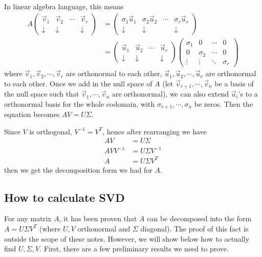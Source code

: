 \documentclass{article}
\begin{document}
In linear algebra language, this means 
\begin{align*}
A \begin{pmatrix} \vec{v}_1 & \vec{v}_2 & \cdots & \vec{v}_r  \\ \downarrow & \downarrow & &\downarrow \end{pmatrix} &= \begin{pmatrix} \sigma_1 \vec{u}_1 & \sigma_2 \vec{u}_2 & \cdots &\sigma_r \vec{u}_r  \\ \downarrow & \downarrow & &\downarrow \end{pmatrix} \\
&= \begin{pmatrix} \vec{u}_1 & \vec{u}_2 & \cdots & \vec{u}_r  \\ \downarrow & \downarrow & &\downarrow \end{pmatrix} \begin{pmatrix} \sigma_1 & 0 & \cdots & 0 \\ 0& \sigma_2 & \cdots & 0 \\ \vdots & \vdots & \ddots & \sigma_r \end{pmatrix}
\end{align*}
where $\vec{v}_1, \vec{v}_2, \cdots, \vec{v}_r$ are orthonormal to each other, $\vec{u}_1, \vec{u}_2, \cdots, \vec{u}_r$ are orthonormal to each other. Once we add in the null space of $A$ (let $\vec{v}_{r+1}, \cdots, \vec{v}_n$ be a basis of the null space such that $\vec{v}_1, \cdots, \vec{v}_n$ are orthonormal), we can also extend $\vec{u}_i$'s to a orthonormal basis for the whole codomain, with $\sigma_{r+1}, \cdots, \sigma_{n}$ be zeros. Then the equation becomes 
$AV=U\Sigma$.

Since $V$ is orthogonal, $V^{-1} = V^T$, hence after rearranging we have
\begin{align*}
AV &= U \Sigma \\
AV V^{-1} &= U \Sigma V^{-1} \\
A &= U\Sigma V^T
\end{align*}
then we get the decomposition form we had for $A$.

\subsection{How to calculate SVD}
For any matrix $A$, it has been proven that $A$ can be decomposed into the form $A = U \Sigma V^T$ (where $U,V$ orthonormal and $\Sigma$ diagonal). The proof of this fact is outside the scope of these notes. However, we will show below how to actually find $U, \Sigma, V$. First, there are a few preliminary results we need to prove.
\bigskip
\end{document}
